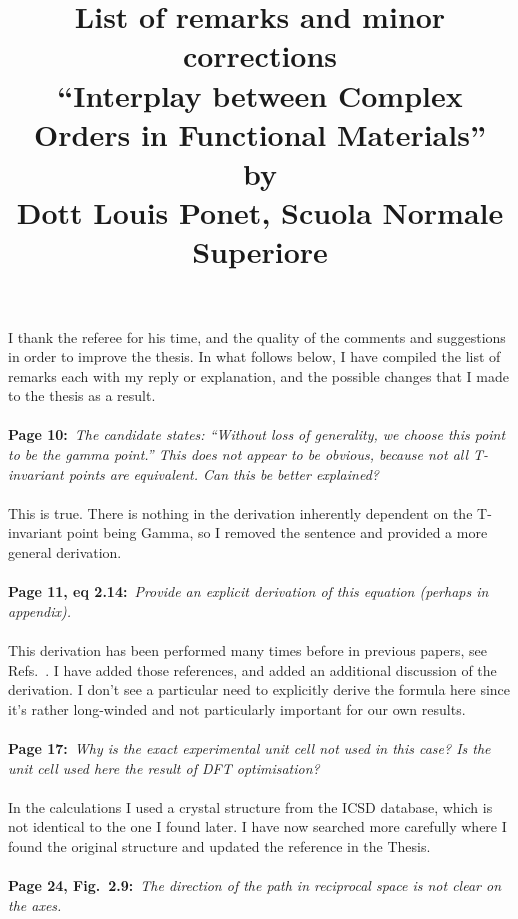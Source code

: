 \documentclass[phd, titlesmallcaps,foronline,oneside]{SNSthesis}
\begin{document}
\title{List of remarks and minor corrections\\
\large ``Interplay between Complex Orders in Functional Materials''\\
by\\
Dott Louis Ponet, Scuola Normale Superiore}
\date{}
\maketitle
I thank the referee for his time, and the quality of the comments and suggestions in order to improve the thesis.
In what follows below, I have compiled the list of remarks each with my reply or explanation, and the possible changes that I made to the thesis as a result.
\\\\
{\bf Page 10:}~{\it The candidate states: ``Without loss of generality, we choose this point to be the gamma point.'' This does not appear to be obvious, because not all T-invariant points are equivalent. Can this be better explained?}
\\\\
This is true. There is nothing in the derivation inherently dependent on the T-invariant point being Gamma, so I removed the sentence and provided a more general derivation.
\\\\
{\bf Page 11, eq 2.14:}~{\it Provide an explicit derivation of this equation (perhaps in appendix).}
\\\\
This derivation has been performed many times before in previous papers, see Refs.~\cite{Rashba1959SymmetryAr, Lowdin1951, Bahramy2011}. I have added those references, and added an additional discussion of the derivation. I don't see a particular need to explicitly derive the formula here since it's rather long-winded and not particularly important for our own results.
\\\\
{\bf Page 17:}~{\it Why is the exact experimental unit cell not used in this case? Is the unit cell used here the result of DFT optimisation?}
\\\\
In the calculations I used a crystal structure from the ICSD database, which is not identical to the one I found later. I have now searched more carefully where I found the original structure and updated the reference in the Thesis. 
\\\\
{\bf Page 24, Fig.~2.9:}~{\it The direction of the path in reciprocal space is not clear on the axes.}
\end{document}
